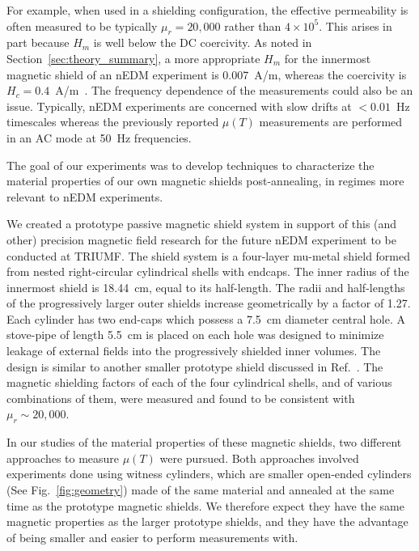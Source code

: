 \documentclass[review]{elsarticle}
\begin{document}
For example, when used in a shielding configuration, the effective
permeability is often measured to be typically $\mu_r=20,000$ rather
than $4\times 10^5$.  This arises in part because $H_m$ is well below
the DC coercivity.  As noted in Section~\ref{sec:theory_summary}, a
more appropriate $H_m$ for the innermost magnetic shield of an nEDM
experiment is 0.007~A/m, whereas the coercivity is
$H_c=0.4$~A/m~\cite{bib:kruppvdm}.  The frequency dependence of the
measurements could also be an issue.  Typically, nEDM experiments are
concerned with slow drifts at $<0.01$~Hz timescales whereas the
previously reported $\mu(T)$ measurements are performed in an AC mode
at 50~Hz frequencies.


The goal of our experiments was to develop techniques to characterize
the material properties of our own magnetic shields post-annealing, in
regimes more relevant to nEDM experiments.


We created a prototype passive magnetic shield system in support of
this (and other) precision magnetic field research for the future nEDM
experiment to be conducted at TRIUMF.  The shield system is a
four-layer mu-metal shield formed from nested right-circular
cylindrical shells with endcaps.  The inner radius of the innermost
shield is 18.44~cm, equal to its half-length. The radii and
half-lengths of the progressively larger outer shields increase
geometrically by a factor of 1.27.  Each cylinder has two end-caps
which possess a 7.5~cm diameter central hole.  A stove-pipe of length
5.5~cm is placed on each hole was designed to minimize leakage of
external fields into the progressively shielded inner volumes.  The
design is similar to another smaller prototype shield discussed in
Ref.~\cite{bib:nmorpaper}.  The magnetic shielding factors of each of
the four cylindrical shells, and of various combinations of them, were
measured and found to be consistent with $\mu_r\sim 20,000$.

In our studies of the material properties of these magnetic shields,
two different approaches to measure $\mu(T)$ were pursued.  Both
approaches involved experiments done using witness cylinders, which
are smaller open-ended cylinders (See Fig.~\ref{fig:geometry}) made of
the same material and annealed at the same time as the prototype
magnetic shields.  We therefore expect they have the same magnetic
properties as the larger prototype shields, and they have the
advantage of being smaller and easier to perform measurements with.
\end{document}
